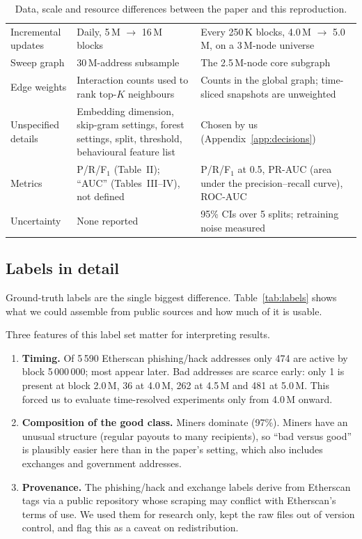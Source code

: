 \documentclass[11pt,a4paper]{article}
\begin{document}
\begin{table}[H]
\begin{tabular}{p{3.0cm} p{5.9cm} p{6.3cm}}
Incremental updates & Daily, 5\,M $\to$ 16\,M blocks & Every 250\,K blocks, 4.0\,M $\to$ 5.0\,M, on a 3\,M-node universe\\
Sweep graph & 30\,M-address subsample & The 2.5\,M-node core subgraph\\
Edge weights & Interaction counts used to rank top-$K$ neighbours & Counts in the global graph; time-sliced snapshots are unweighted\\
Unspecified details & Embedding dimension, skip-gram settings, forest settings, split, threshold, behavioural feature list & Chosen by us (Appendix~\ref{app:decisions})\\
Metrics & P/R/F$_1$ (Table~II); ``AUC'' (Tables~III--IV), not defined & P/R/F$_1$ at 0.5, PR-AUC (area under the precision--recall curve), ROC-AUC\\
Uncertainty & None reported & 95\% CIs over 5 splits; retraining noise measured\\
\bottomrule
\end{tabular}
\caption{Data, scale and resource differences between the paper and this reproduction.}
\label{tab:constraints}
\end{table}

\subsection{Labels in detail}
Ground-truth labels are the single biggest difference. Table~\ref{tab:labels} shows what we could assemble from public sources and how much of it is usable.
\begin{table}[H]
\centering\footnotesize

\caption{Public label sources and how many labeled addresses exist in our graph.}
\label{tab:labels}
\end{table}
Three features of this label set matter for interpreting results.
\begin{enumerate}
\item \textbf{Timing.} Of 5\,590 Etherscan phishing/hack addresses only 474 are active by block 5\,000\,000; most appear later. Bad addresses are scarce early: only 1 is present at block 2.0\,M, 36 at 4.0\,M, 262 at 4.5\,M and 481 at 5.0\,M. This forced us to evaluate time-resolved experiments only from 4.0\,M onward.
\item \textbf{Composition of the good class.} Miners dominate (97\%). Miners have an unusual structure (regular payouts to many recipients), so ``bad versus good'' is plausibly easier here than in the paper's setting, which also includes exchanges and government addresses.
\item \textbf{Provenance.} The phishing/hack and exchange labels derive from Etherscan tags via a public repository whose scraping may conflict with Etherscan's terms of use. We used them for research only, kept the raw files out of version control, and flag this as a caveat on redistribution.
\end{enumerate}
\end{document}

